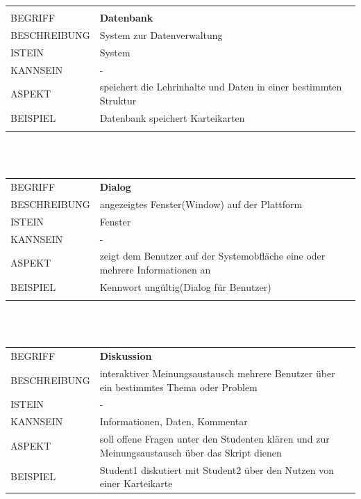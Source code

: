 \documentclass[12pt,a4paper]{article}
\begin{document}
\begin{tabular}{l p{12cm}}
	\hline\\
	BEGRIFF 	 & \textbf{Datenbank} \\ 
	BESCHREIBUNG & System zur Datenverwaltung\\ 
	ISTEIN   	 & System\\
	KANNSEIN 	 & - \\ 
	ASPEKT   	 & speichert die Lehrinhalte und Daten in einer bestimmten Struktur\\
	BEISPIEL 	 & Datenbank speichert Karteikarten\\\\
	\hline
\end{tabular}\\\\ 

\begin{tabular}{l p{12cm}}
	BEGRIFF 	 & \textbf{Dialog} \\ 
	BESCHREIBUNG & angezeigtes Fenster(Window) auf der Plattform\\ 
	ISTEIN   	 & Fenster\\
	KANNSEIN 	 & - \\ 
	ASPEKT   	 & zeigt dem Benutzer auf der Systemobfläche eine oder mehrere Informationen an\\
	BEISPIEL 	 & Kennwort ungültig(Dialog für Benutzer)\\\\
	\hline
\end{tabular}\\\\  

\begin{tabular}{l p{12cm}}
	BEGRIFF 	 & \textbf{Diskussion} \\ 
	BESCHREIBUNG & interaktiver Meinungsaustausch mehrere Benutzer über ein bestimmtes Thema oder Problem\\ 
	ISTEIN   	 & -\\
	KANNSEIN 	 & Informationen, Daten, Kommentar\\ 
	ASPEKT   	 & soll offene Fragen unter den Studenten klären und zur Meinungsaustausch über das Skript dienen \\
	BEISPIEL 	 & Student1 diskutiert mit Student2 über den Nutzen von einer Karteikarte \\
	\hline
\end{tabular}\\\\  
\end{document}
